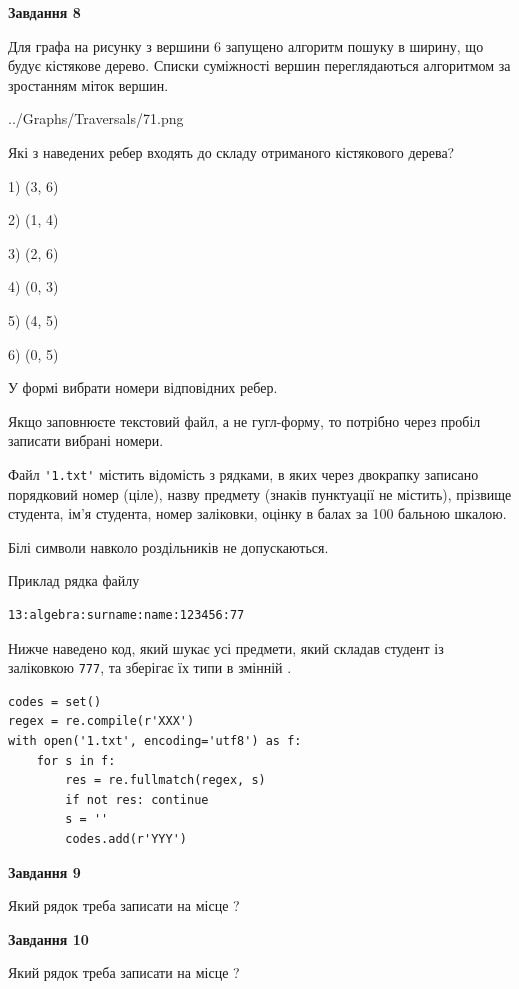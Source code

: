 \documentclass[12pt, ukrainian]{article}
\def\code#1{\Verb!#1!}
\begin{document}
{\begin {large}
{\begin {center}\textbf{Завдання 8}\end {center}}\par
Для графа на рисунку з вершини 6 запущено алгоритм пошуку в ширину, що будує кістякове дерево. Списки суміжності вершин переглядаються алгоритмом за зростанням міток вершин.\par
\begin{center}
	{../Graphs/Traversals/71.png}
\end{center}
\par Які з наведених ребер входять до складу отриманого кістякового дерева?\par
1) (3, 6)\par
2) (1, 4)\par
3) (2, 6)\par
4) (0, 3)\par
5) (4, 5)\par
6) (0, 5)\par
{\vskip 15pt} У формі вибрати номери відповідних ребер.


Якщо заповнюєте текстовий файл, а не гугл-форму, то потрібно через пробіл записа\-ти вибрані номери.\par
\newpage


Файл \code{'1.txt'} містить відомість з рядками, в яких через двокрапку записано поряд\-ковий номер (ціле), назву предмету (знаків пунктуації не містить), прізвище студента, ім'я студента, номер заліковки, оцінку в балах за 100 бальною шкалою.

Білі символи навколо роздільників не допускаються.

Приклад рядка файлу



\begin{verbatim}
13:algebra:surname:name:123456:77
\end{verbatim}


Нижче наведено код, який шукає усі предмети, який складав студент із заліковкою \code{777}, та зберігає їх типи в змінній .



\begin{verbatim}
codes = set()
regex = re.compile(r'XXX')
with open('1.txt', encoding='utf8') as f:
    for s in f:
        res = re.fullmatch(regex, s)
        if not res: continue
        s = ''
        codes.add(r'YYY')
\end{verbatim}


{\begin {center}\textbf{Завдання 9}\end {center}}\par
Який рядок треба записати на місце  ?\par
\vspace{5mm}


{\begin {center}\textbf{Завдання 10}\end {center}}\par
Який рядок треба записати на місце  ?\par


\newpage


\end {large}}
\end{document}
